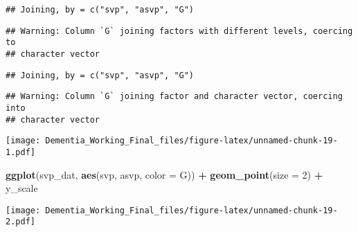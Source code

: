 \documentclass[]{article}
\newenvironment{Shaded}{\begin{snugshade}}{\end{snugshade}}
\newcommand{\DataTypeTok}[1]{\textcolor[rgb]{0.13,0.29,0.53}{#1}}
\newcommand{\DecValTok}[1]{\textcolor[rgb]{0.00,0.00,0.81}{#1}}
\newcommand{\KeywordTok}[1]{\textcolor[rgb]{0.13,0.29,0.53}{\textbf{#1}}}
\newcommand{\NormalTok}[1]{#1}
\newcommand{\OperatorTok}[1]{\textcolor[rgb]{0.81,0.36,0.00}{\textbf{#1}}}
\newcommand{\StringTok}[1]{\textcolor[rgb]{0.31,0.60,0.02}{#1}}
\begin{document}
\begin{verbatim}
## Joining, by = c("svp", "asvp", "G")
\end{verbatim}

\begin{verbatim}
## Warning: Column `G` joining factors with different levels, coercing to
## character vector
\end{verbatim}

\begin{verbatim}
## Joining, by = c("svp", "asvp", "G")
\end{verbatim}

\begin{verbatim}
## Warning: Column `G` joining factor and character vector, coercing into
## character vector
\end{verbatim}

\begin{Shaded}
\end{Shaded}

\texttt{[image: Dementia\_Working\_Final\_files/figure-latex/unnamed-chunk-19-1.pdf]}

\begin{Shaded}
\begin{Highlighting}[]
\KeywordTok{ggplot}\NormalTok{(svp_dat, }\KeywordTok{aes}\NormalTok{(svp, asvp, }\DataTypeTok{color =}\NormalTok{ G)) }\OperatorTok{+}\StringTok{ }\KeywordTok{geom_point}\NormalTok{(}\DataTypeTok{size =} \DecValTok{2}\NormalTok{) }\OperatorTok{+}\StringTok{ }\NormalTok{y_scale}
\end{Highlighting}
\end{Shaded}

\texttt{[image: Dementia\_Working\_Final\_files/figure-latex/unnamed-chunk-19-2.pdf]}

\begin{Shaded}
\end{Shaded}
\end{document}
